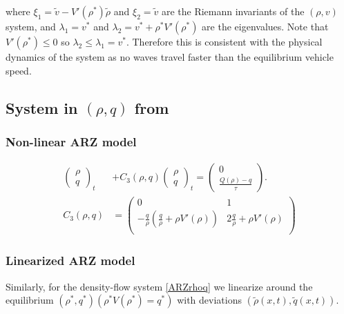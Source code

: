 \documentclass[a4paper, 10pt, conference]{ieeeconf}      %
\begin{document}
where $\xi_1 = \tilde{v} - V'( \rho^* )\tilde{\rho}$ and $\xi_2 = \tilde{v}$ are the Riemann invariants of the $(\rho, v)$ system, and $\lambda_1 = v^*$ and $\lambda_2 = v^* + \rho^* V'( \rho^*)$ are the eigenvalues. Note that $V'( \rho^*) \leq 0$ so $\lambda_2 \leq \lambda_1 = v^*$. Therefore this is consistent with the physical dynamics of the system as no waves travel faster than the equilibrium vehicle speed.


\subsection{System in $(\rho, q)$ from}

\subsubsection{Non-linear ARZ model}
\begin{subequations}
\begin{align}
\begin{pmatrix}
	\rho \\
	q
\end{pmatrix}_t 
&+
C_3\left(\rho, q\right)
\begin{pmatrix}
	\rho \\ 
	q
\end{pmatrix}_t
=
\begin{pmatrix}
	0 \\ 
	\frac{Q(\rho) - q}{\tau}
\end{pmatrix}. \label{ARZvq} \\
C_3 \left(\rho, q \right)
&= 
\begin{pmatrix}
	0 & 1 \\
	- \frac{q}{\rho} \left( \frac{q}{\rho} + \rho V'\left( \rho \right) \right) & 2 \frac{q}{\rho} + \rho V'\left( \rho \right) \\
\end{pmatrix}
\end{align}
\end{subequations}

\subsubsection{Linearized ARZ model}
Similarly, for the density-flow system \eqref{ARZrhoq} we linearize around the equilibrium $(\rho^*, q^*)(\rho^*V(\rho^*) = q^*)$ with deviations $(\tilde{\rho}(x,t), \tilde{q}(x,t))$.
\end{document}

